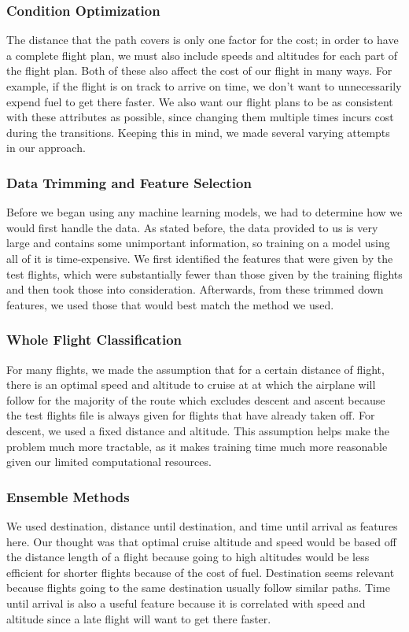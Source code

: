 \documentclass{article}[12pt]
\begin{document}
\begin{multicols}{2}
\subsubsection{Condition Optimization}
The distance that the path covers is only one factor for the cost; in order to have a complete flight plan, we must also include speeds and altitudes for each part of the flight plan. Both of these also affect the cost of our flight in many ways. For example, if the flight is on track to arrive on time, we don't want to unnecessarily expend fuel to get there faster. We also want our flight plans to be as consistent with these attributes as possible, since changing them multiple times incurs cost during the transitions. Keeping this in mind, we made several varying attempts in our approach. 

\subsubsection{Data Trimming and Feature Selection}

Before we began using any machine learning models, we had to determine how we would first handle the data. As stated before, the data provided to us is very large and contains some unimportant information, so training on a model using all of it is time-expensive. We first identified the features that were given by the test flights, which were substantially fewer than those given by the training flights and then took those into consideration. Afterwards, from these trimmed down features, we used those that would best match the method we used. 

\subsubsection{Whole Flight Classification}
For many flights, we made the assumption that for a certain distance of flight, there is an optimal speed and altitude to cruise at at which the airplane will follow for the majority of the route which excludes descent and ascent because the test flights file is always given for flights that have already taken off. For descent, we used a fixed distance and altitude. This assumption helps make the problem much more tractable, as it makes training time much more reasonable given our limited computational resources.

\subsubsection{Ensemble Methods}
We used destination, distance until destination, and time until arrival as features here. Our thought was that optimal cruise altitude and speed would be based off the distance length of a flight because going to high altitudes would be less efficient for shorter flights because of the cost of fuel. Destination seems relevant because flights going to the same destination usually follow similar paths. Time until arrival is also a useful feature because it is correlated with speed and altitude since a late flight will want to get there faster.
\\


\end{multicols}
\end{document}
